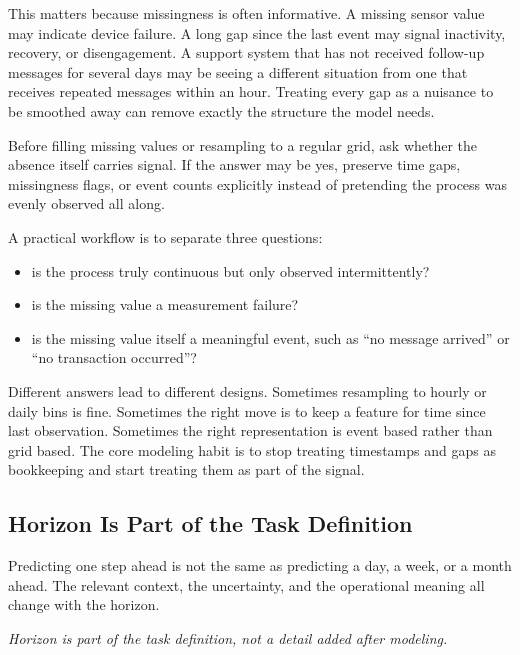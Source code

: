 This matters because missingness is often informative. A missing sensor value may indicate device failure. A long gap since the last event may signal inactivity, recovery, or disengagement. A support system that has not received follow-up messages for several days may be seeing a different situation from one that receives repeated messages within an hour. Treating every gap as a nuisance to be smoothed away can remove exactly the structure the model needs.

\begin{decisionbox}
Before filling missing values or resampling to a regular grid, ask whether the absence itself carries signal. If the answer may be yes, preserve time gaps, missingness flags, or event counts explicitly instead of pretending the process was evenly observed all along.
\end{decisionbox}

A practical workflow is to separate three questions:
\begin{itemize}[leftmargin=*]
\item is the process truly continuous but only observed intermittently?
\item is the missing value a measurement failure?
\item is the missing value itself a meaningful event, such as ``no message arrived'' or ``no transaction occurred''?
\end{itemize}

Different answers lead to different designs. Sometimes resampling to hourly or daily bins is fine. Sometimes the right move is to keep a feature for time since last observation. Sometimes the right representation is event based rather than grid based. The core modeling habit is to stop treating timestamps and gaps as bookkeeping and start treating them as part of the signal.

\subsection{Horizon Is Part of the Task Definition}

Predicting one step ahead is not the same as predicting a day, a week, or a month ahead. The relevant context, the uncertainty, and the operational meaning all change with the horizon.

\begin{center}
\emph{Horizon is part of the task definition, not a detail added after modeling.}
\end{center}

